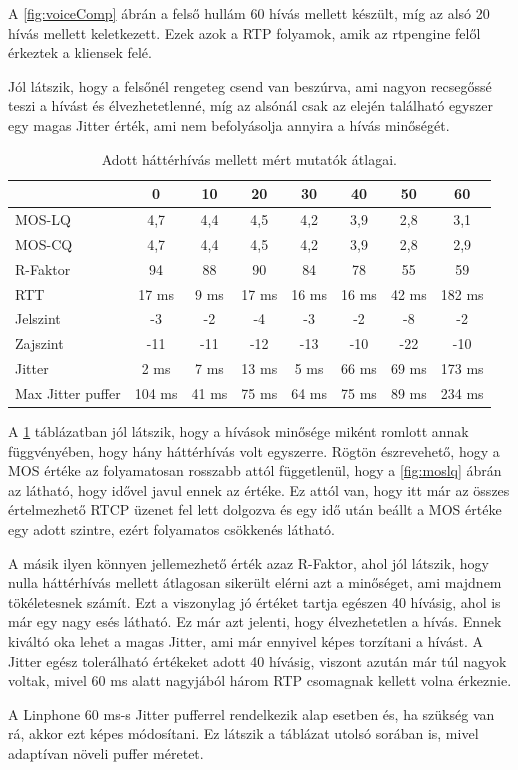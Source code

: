 A \ref{fig:voiceComp} ábrán a felső hullám 60 hívás mellett készült, míg az alsó 20 hívás 
mellett keletkezett. Ezek azok a RTP folyamok, amik az rtpengine felől érkeztek a 
kliensek felé. 

Jól látszik, hogy a felsőnél rengeteg csend van beszúrva, ami nagyon recsegőssé teszi a 
hívást és élvezhetetlenné, míg az alsónál csak az elején található egyszer egy magas 
Jitter érték, ami nem befolyásolja annyira a hívás minőségét.

\begin{table}[H]
	\footnotesize
	\centering
	\begin{tabular}{l c c c c c c c}
		\toprule
		 & 0 & 10 & 20 & 30 & 40 & 50 & 60\\
		\midrule
		MOS-LQ & 4,7 & 4,4 & 4,5 & 4,2 & 3,9 & 2,8 & 3,1\\
		MOS-CQ & 4,7 & 4,4 & 4,5 & 4,2 & 3,9 & 2,8 & 2,9\\
		R-Faktor & 94 & 88 & 90 & 84 & 78 & 55 & 59\\
		RTT & 17 ms & 9 ms & 17 ms & 16 ms & 16 ms & 42 ms & 182 ms\\
		Jelszint & -3 & -2 & -4 & -3 & -2 & -8 & -2\\
		Zajszint & -11 & -11 & -12 & -13 & -10 & -22 & -10\\
		Jitter & 2 ms & 7 ms & 13 ms & 5 ms & 66 ms & 69 ms & 173 ms\\
		Max Jitter puffer & 104 ms & 41 ms & 75 ms & 64 ms & 75 ms & 89 ms & 234 ms\\
		\bottomrule
	\end{tabular}
	\caption{Adott háttérhívás mellett mért mutatók átlagai.}
	\label{tab:callValues}
\end{table}

A \ref{tab:callValues} táblázatban jól látszik, hogy a hívások minősége miként romlott 
annak függvényében, hogy hány háttérhívás volt egyszerre. Rögtön észrevehető, hogy a 
MOS értéke az folyamatosan rosszabb attól függetlenül, hogy a \ref{fig:moslq} ábrán az 
látható, hogy idővel javul ennek az értéke. Ez attól van, hogy itt már az összes  
értelmezhető RTCP üzenet fel lett dolgozva és egy idő után beállt a MOS értéke egy adott 
szintre, ezért folyamatos csökkenés látható. 

A másik ilyen könnyen jellemezhető érték azaz R-Faktor, ahol jól látszik, hogy nulla 
háttérhívás mellett átlagosan sikerült elérni azt a minőséget, ami majdnem tökéletesnek 
számít. Ezt a viszonylag jó értéket tartja egészen 40 hívásig, ahol is már egy nagy esés 
látható. Ez már azt jelenti, hogy élvezhetetlen a hívás. Ennek kiváltó oka lehet a magas 
Jitter, ami már ennyivel képes torzítani a hívást. A Jitter egész tolerálható értékeket 
adott 40 hívásig, viszont azután már túl nagyok voltak, mivel 60 ms alatt nagyjából három 
RTP csomagnak kellett volna érkeznie.

A Linphone 60 ms-s Jitter pufferrel rendelkezik alap esetben és, ha szükség van rá, akkor 
ezt képes módosítani. Ez látszik a táblázat utolsó sorában is, mivel adaptívan növeli 
puffer méretet. 